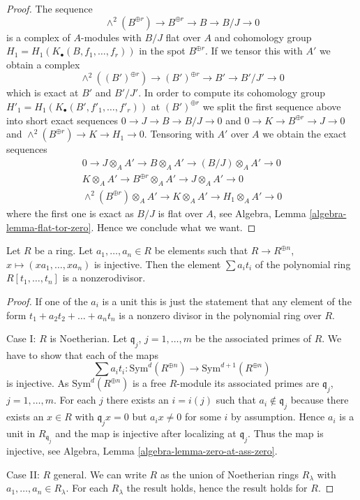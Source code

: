 \begin{proof}
The sequence
$$
\wedge^2(B^{\oplus r}) \to B^{\oplus r} \to B \to B/J \to 0
$$
is a complex of $A$-modules with $B/J$ flat over $A$ and
cohomology group $H_1 = H_1(K_\bullet(B, f_1, \ldots, f_r))$ in the spot
$B^{\oplus r}$. If we tensor this with $A'$ we obtain a complex
$$
\wedge^2((B')^{\oplus r}) \to (B')^{\oplus r} \to B' \to B'/J' \to 0
$$
which is exact at $B'$ and $B'/J'$. In order to compute its
cohomology group $H'_1 = H_1(K_\bullet(B', f'_1, \ldots, f'_r))$
at $(B')^{\oplus r}$ we split the first sequence above into
short exact sequences
$0 \to J \to B \to B/J \to 0$ and
$0 \to K \to B^{\oplus r} \to J \to 0$ and
$\wedge^2(B^{\oplus r}) \to K \to H_1 \to 0$.
Tensoring with $A'$ over $A$ we obtain the exact sequences
$$
\begin{matrix}
0 \to J \otimes_A A' \to B \otimes_A A' \to (B/J) \otimes_A A' \to 0 \\
K \otimes_A A' \to B^{\oplus r} \otimes_A A' \to J \otimes_A A' \to 0 \\
\wedge^2(B^{\oplus r}) \otimes_A A' \to K \otimes_A A' \to H_1 \otimes_A A'
\to 0
\end{matrix}
$$
where the first one is exact as $B/J$ is flat over $A$, see
Algebra, Lemma \ref{algebra-lemma-flat-tor-zero}.
Hence we conclude what we want.
\end{proof}

\begin{lemma}
\label{lemma-make-nonzero-divisor}
Let $R$ be a ring. Let $a_1, \ldots, a_n \in R$ be elements such
that $R \to R^{\oplus n}$, $x \mapsto (xa_1, \ldots, xa_n)$ is injective.
Then the element $\sum a_i t_i$ of the polynomial ring $R[t_1, \ldots, t_n]$
is a nonzerodivisor.
\end{lemma}

\begin{proof}
If one of the $a_i$ is a unit this is just the statement that any
element of the form $t_1 + a_2 t_2 + \ldots + a_n t_n$ is a nonzero
divisor in the polynomial ring over $R$.

\medskip\noindent
Case I: $R$ is Noetherian. Let $\mathfrak q_j$, $j = 1, \ldots, m$
be the associated primes of $R$. We have to show that
each of the maps
$$
\sum a_i t_i :
\text{Sym}^d(R^{\oplus n})
\longrightarrow
\text{Sym}^{d + 1}(R^{\oplus n})
$$
is injective. As $\text{Sym}^d(R^{\oplus n})$ is a free $R$-module its
associated primes are $\mathfrak q_j$, $j = 1, \ldots, m$. For each $j$
there exists an $i = i(j)$ such that $a_i \not \in \mathfrak q_j$ because
there exists an $x \in R$ with $\mathfrak q_jx = 0$ but $a_i x \not = 0$
for some $i$ by assumption. Hence $a_i$ is a unit in $R_{\mathfrak q_j}$
and the map is injective after localizing at $\mathfrak q_j$. Thus the map
is injective, see
Algebra, Lemma \ref{algebra-lemma-zero-at-ass-zero}.

\medskip\noindent
Case II: $R$ general. We can write $R$ as the union of Noetherian
rings $R_\lambda$ with $a_1, \ldots, a_n \in R_\lambda$. For each $R_\lambda$
the result holds, hence the result holds for $R$.
\end{proof}

